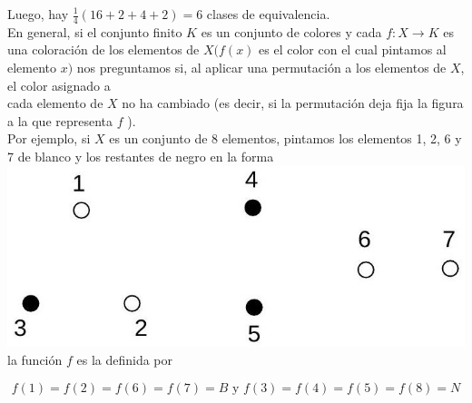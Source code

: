 \documentclass[10pt]{article}
\begin{document}
Luego, hay $\frac{1}{4}(16+2+4+2)=6$ clases de equivalencia.\\
En general, si el conjunto finito $K$ es un conjunto de colores y cada $f: X \longrightarrow K$ es una coloración de los elementos de $X(f(x)$ es el color con el cual pintamos al elemento $x)$ nos preguntamos si, al aplicar una permutación a los elementos de $X$, el color asignado a\\
cada elemento de $X$ no ha cambiado (es decir, si la permutación deja fija la figura a la que representa $f$ ).\\
Por ejemplo, si $X$ es un conjunto de 8 elementos, pintamos los elementos 1, 2, 6 y 7 de blanco y los restantes de negro en la forma\\
\includegraphics[max width=\textwidth, center]{2025_09_05_3ba26226ec0baddb5a03g-54(2)}\\
la función $f$ es la definida por

$$
f(1)=f(2)=f(6)=f(7)=B \text { y } f(3)=f(4)=f(5)=f(8)=N
$$
\end{document}

